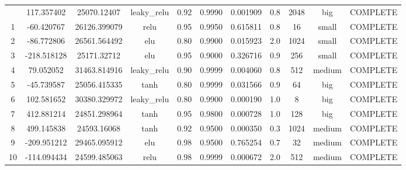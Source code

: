 \begin{longtable}{ccccccccccc}
\bottomrule
\endlastfoot
                        0 &                 117.357402 &                        25070.12407 &     leaky\_relu &        0.92 & 0.9990 &       0.001909 &             0.8 &     2048 &       big & COMPLETE \\
                        1 &                 -60.420767 &                       26126.399079 &            relu &        0.95 & 0.9950 &       0.615811 &             0.8 &       16 &     small & COMPLETE \\
                        2 &                 -86.772806 &                       26561.564492 &             elu &        0.80 & 0.9900 &       0.015923 &             2.0 &     1024 &     small & COMPLETE \\
                        3 &                -218.518128 &                        25171.32712 &             elu &        0.95 & 0.9000 &       0.326716 &             0.9 &      256 &     small & COMPLETE \\
                        4 &                  79.052052 &                       31463.814916 &     leaky\_relu &        0.90 & 0.9999 &       0.004060 &             0.8 &      512 &    medium & COMPLETE \\
                        5 &                 -45.739587 &                       25056.415335 &            tanh &        0.80 & 0.9999 &       0.031566 &             0.9 &       64 &       big & COMPLETE \\
                        6 &                 102.581652 &                       30380.329972 &     leaky\_relu &        0.80 & 0.9900 &       0.000190 &             1.0 &        8 &       big & COMPLETE \\
                        7 &                 412.881214 &                       24851.298964 &            tanh &        0.95 & 0.9800 &       0.000728 &             1.0 &      128 &       big & COMPLETE \\
                        8 &                 499.145838 &                        24593.16068 &            tanh &        0.92 & 0.9500 &       0.000350 &             0.3 &     1024 &    medium & COMPLETE \\
                        9 &                -209.951212 &                       29465.095912 &             elu &        0.98 & 0.9500 &       0.765254 &             0.7 &       32 &    medium & COMPLETE \\
                       10 &                -114.094434 &                       24599.485063 &            relu &        0.98 & 0.9999 &       0.000672 &             2.0 &      512 &    medium & COMPLETE \\

\end{longtable}
